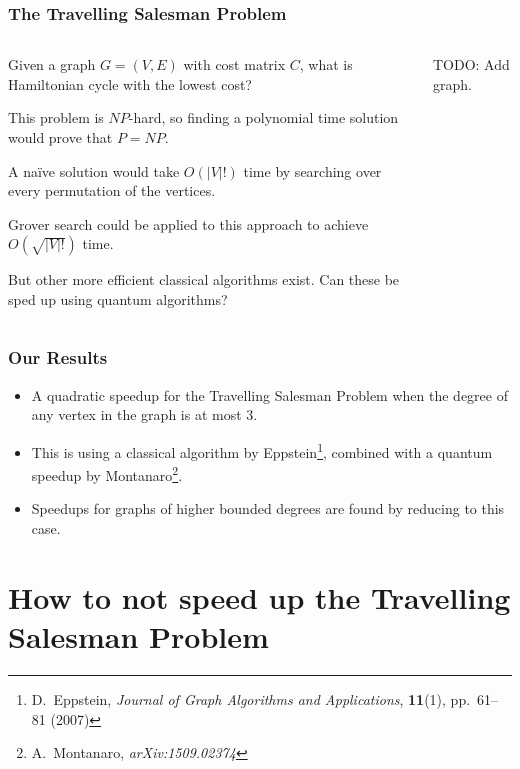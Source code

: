 \documentclass[aspectratio=169]{beamer}
\begin{document}
\begin{frame}
\frametitle{The Travelling Salesman Problem}
\begin{columns}[T]
\begin{column}{.5\textwidth}
Given a graph $G = (V, E)$ with cost matrix $C$, what is Hamiltonian cycle with the lowest cost?

This problem is $NP$-hard, so finding a polynomial time solution would prove that $P = NP$.

A na\"ive solution would take $O(|V|!)$ time by searching over every permutation of the vertices.

Grover search could be applied to this approach to achieve $O(\sqrt{|V|!})$ time.

But other more efficient classical algorithms exist. Can these be sped up using quantum algorithms?
\end{column}
\begin{column}{.5\textwidth}
TODO: Add graph.
\end{column}
\end{columns}
\end{frame}

\begin{frame}
\frametitle{Our Results}
\begin{itemize}
\item A quadratic speedup for the Travelling Salesman Problem when the degree of any vertex in the graph is at most $3$.
\item This is using a classical algorithm by Eppstein\footnote{D.\ Eppstein, {\em Journal of Graph Algorithms and Applications}, {\bf 11}(1), pp.\ 61--81 (2007)}, combined with a quantum speedup by Montanaro\footnote{A.\ Montanaro, {\em arXiv:1509.02374}}.
\item Speedups for graphs of higher bounded degrees are found by reducing to this case.
\end{itemize}
\end{frame}

\section{How to not speed up the Travelling Salesman Problem}
\end{document}
